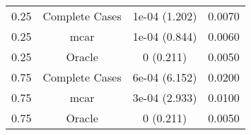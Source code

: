 \begin{table}[ht]
\centering
\begin{tabular}{cccc}
  \hline
  \hline
0.25 & Complete Cases & 1e-04 (1.202) & 0.0070 \\ 
  0.25 & mcar & 1e-04 (0.844) & 0.0060 \\ 
  0.25 & Oracle & 0 (0.211) & 0.0050 \\ 
  0.75 & Complete Cases & 6e-04 (6.152) & 0.0200 \\ 
  0.75 & mcar & 3e-04 (2.933) & 0.0100 \\ 
  0.75 & Oracle & 0 (0.211) & 0.0050 \\ 
   \hline
\end{tabular}
\end{table}
